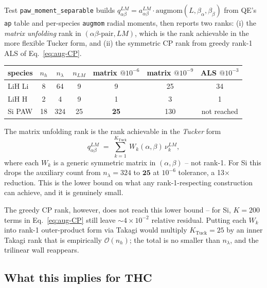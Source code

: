 \documentclass[aps,prb,reprint,superscriptaddress,nofootinbib]{revtex4-2}
\begin{document}
Test \texttt{paw\_moment\_separable} builds
\(q^{LM}_{\alpha\beta}=a^{LM}_{\alpha\beta}\cdot\mathrm{augmom}(L,\beta_\alpha,\beta_\beta)\)
from QE's \texttt{ap} table and per-species \texttt{augmom} radial
moments, then reports two ranks: (i) the \emph{matrix unfolding} rank
in \((\alpha\beta\text{-pair},LM)\), which is the rank achievable in
the more flexible Tucker form, and (ii) the symmetric CP rank from
greedy rank-1 ALS of Eq.~\eqref{eq:aug-CP}.

\begin{table}[h]
\centering
\begin{tabular}{lcccccc}
\hline
species & \(n_h\) & \(n_\lambda\) & \(n_{LM}\) & matrix \(@10^{-6}\) & matrix \(@10^{-9}\) & ALS \(@10^{-3}\) \\
\hline
LiH Li & 8  & 64  & 9  & 9   & 25  & 34 \\
LiH H  & 2  & 4   & 9  & 1   & 3   & 1  \\
Si PAW & 18 & 324 & 25 & \textbf{25}  & 130 & not reached \\
\hline
\end{tabular}
\end{table}

The matrix unfolding rank is the rank achievable in the
\emph{Tucker} form
\begin{equation}
q^{LM}_{\alpha\beta}
\;=\;\sum_{k=1}^{K_{\text{Tuck}}}\,
W_k(\alpha,\beta)\,\nu_k^{LM},
\label{eq:aug-Tucker}
\end{equation}
where each \(W_k\) is a generic symmetric matrix in \((\alpha,\beta)\)
-- not rank-1.  For Si this drops the auxiliary count from
\(n_\lambda=324\) to \(\mathbf{25}\) at \(10^{-6}\) tolerance, a 13×
reduction.  This is the lower bound on what any rank-1-respecting
construction can achieve, and it is genuinely small.

The greedy CP rank, however, does not reach this lower bound -- for
Si, \(K=200\) terms in Eq.~\eqref{eq:aug-CP} still leave
\(\sim4\times 10^{-2}\) relative residual.  Putting each \(W_k\) into
rank-1 outer-product form via Takagi would multiply
\(K_{\text{Tuck}}=25\) by an inner Takagi rank that is empirically
\(\mathcal O(n_h)\); the total is no smaller than \(n_\lambda\), and
the trilinear wall reappears.

\subsection{What this implies for THC}
\end{document}
